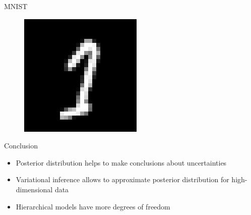 \documentclass{beamer}
\begin{document}
\begin{frame}{MNIST}
\begin{minipage}[t]{0.32\columnwidth}
\begin{figure}
			\includegraphics[width=1\columnwidth]{pres_pics/low_conf/11}
		\end{figure}
	\end{minipage}
\end{frame}

\begin{frame}{Conclusion}
	\begin{itemize}
		\item Posterior distribution helps to make conclusions about uncertainties
		\vspace{0.2cm}
		\item Variational inference allows to approximate posterior distribution for high-dimensional data
		\vspace{0.2cm}
		\item Hierarchical models have more degrees of freedom
	\end{itemize}
\end{frame}
\end{document}
